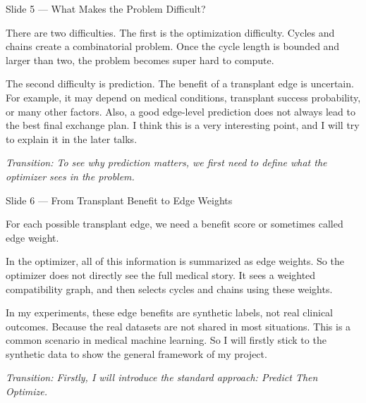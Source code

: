 \documentclass[11pt, aspectratio=169]{beamer}
\newcommand{\tr}[1]{\vspace{0.35em}\textit{\textcolor{black!55}{Transition: #1}}}
\newcommand{\timing}[1]{}
\begin{document}
\begin{frame}{Slide 5 \enspace\textmd{\small\textcolor{black!40}{--- What Makes the Problem Difficult?}}}
\small
\timing{40 seconds}

There are two difficulties. The first is the optimization difficulty. Cycles and
chains create a combinatorial problem. Once the cycle length is bounded and
larger than two, the problem becomes super hard to compute.

\vspace{0.35em}
The second difficulty is prediction. The benefit of a transplant edge is
uncertain. For example, it may depend on medical conditions, transplant success probability, 
or many other factors. Also, a good edge-level prediction does
not always lead to the best final exchange plan. I think this is a very
interesting point, and I will try to explain it in the later talks.

\tr{To see why prediction matters, we first need to define what the optimizer sees in the problem.}
\end{frame}

\begin{frame}{Slide 6 \enspace\textmd{\small\textcolor{black!40}{--- From Transplant Benefit to Edge Weights}}}
\small
\timing{40 seconds}

For each possible transplant edge, we need a benefit score or sometimes called edge weight. 

\vspace{0.35em}
In the optimizer, all of this information is summarized as edge weights. So the
optimizer does not directly see the full medical story. It sees a weighted
compatibility graph, and then selects cycles and chains using these weights.

\vspace{0.35em}
In my experiments, these edge benefits are synthetic labels, not real clinical
outcomes. Because the real datasets are not shared in most situations. This is
a common scenario in medical machine learning. So I will firstly stick to the
synthetic data to show the general framework of my project.

\tr{Firstly, I will introduce the standard approach: Predict Then Optimize.}
\end{frame}
\end{document}
